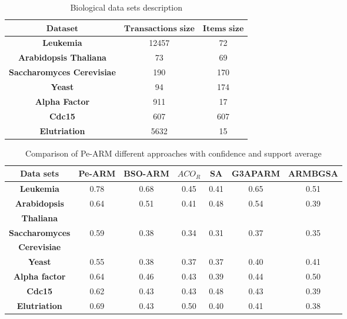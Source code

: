 \documentclass[preprint,12pt]{elsarticle}
\begin{document}
 \begin{table}
\small
\caption{Biological data sets description}
\begin{center}
\begin{tabular}{c c c}
\toprule
$\textbf{Dataset}$&$\textbf{Transactions size}$&$\textbf{Items size}$\\\hline
\textbf{Leukemia}&	12457&	72 \\\hline
\textbf{Arabidopsis Thaliana}&	73&	69\\\hline
\textbf{Saccharomyces Cerevisiae}&	190&	170\\\hline
\textbf{Yeast}&	94&	174\\\hline
\textbf{Alpha Factor}&	911&	17\\\hline
\textbf{Cdc15}&	607&	607\\\hline
\textbf{Elutriation}&	5632&	15\\\hline
\bottomrule
\end{tabular}
\end{center}
\end{table}
\begin{table}[htbp]
\small
\centering
\label{Fig6}
\caption{Comparison of Pe-ARM different approaches with confidence and support average }
\begin{tabular}{c c c c c c c}
\toprule
\textbf{Data sets} &  Pe-ARM& BSO-ARM & $ACO_{R}$ & SA & G3APARM & ARMBGSA\\
\toprule
\textbf{Leukemia}                &	0.78 &	0.68& 0.45 & 0.41	& 0.65 & 0.51	\\\hline
\textbf{Arabidopsis }  &  \multirow{2}{*}{0.64} &  \multirow{2}{*}{0.51}& \multirow{2}{*}{0.41} & \multirow{2}{*}{0.48} & \multirow{2}{*}{0.54} & \multirow{2}{*}{0.39} \\
\textbf{Thaliana} &   & &	 &  &  & \\\hline
\textbf{Saccharomyces}& \multirow{2}{*}{ 0.59 }& \multirow{2}{*}{ 0.38}&	\multirow{2}{*}{0.34} & \multirow{2}{*}{0.31} & \multirow{2}{*}{0.37} & \multirow{2}{*}{0.35}	\\
\textbf{Cerevisiae} &   & &	 &  &  & \\\hline
\textbf{Yeast}                   &	0.55 &	0.38& 0.37 & 0.37 & 0.40 & 0.41 \\\hline
\textbf{Alpha factor}            &	0.64 &	0.46&	0.43 & 0.39	& 0.44 & 0.50	\\\hline
\textbf{Cdc15}                   &	0.62 &	0.43& 0.43 & 0.48 & 0.43 & 0.39	\\\hline
\textbf{Elutriation}             &	0.69 &	0.43&	0.50 & 0.40 & 0.41 & 0.38	\\\hline
\bottomrule
\end{tabular}
\end{table}
\end{document}
